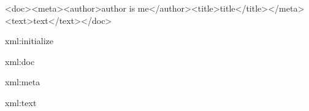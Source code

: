 \continuewhenlmtxmode

\startbuffer[demo]
<doc><meta><author>author is me</author><title>title</title></meta><text>text</text></doc>
\stopbuffer

\startTEXpage

\startxmlsetups xml:initialize
\stopxmlsetups


\startxmlsetups xml:doc
\stopxmlsetups

\startxmlsetups xml:meta
\setupmetadata
  [author={\xmltext{#1}{/author}},
   title={\xmltext{#1}{/title}}]
\stopxmlsetups


\startxmlsetups xml:text
\stopxmlsetups

\setupinteraction[state=start]



\stopTEXpage
